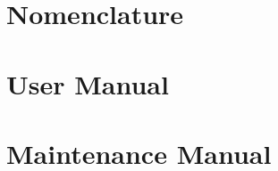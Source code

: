 \documentclass[11pt]{report}
\begin{document}
  \begin{appendices}
    \chapter{Nomenclature}
    \label{cha:glossary}
    
      
    
    \chapter{User Manual}
    \label{cha:user}
      
      
    
    \chapter{Maintenance Manual}
    \label{cha:maint}
    
      
      
  \end{appendices}
\end{document}
